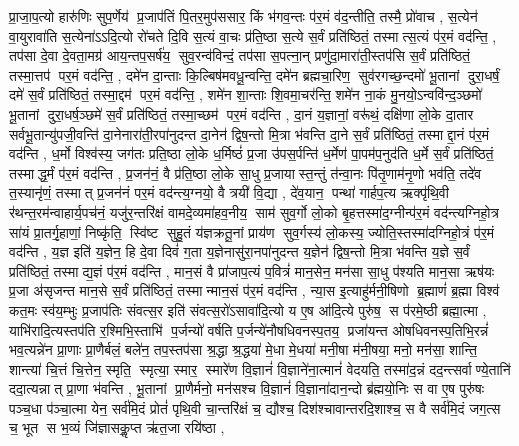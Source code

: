 प्रा॒जा॒प॒त्यो हारु॑णिः सुप॒र्णेय॑ प्र॒जाप॑तिं पि॒तर॒मुप॑ससार॒ किं भ॑गव॒न्तः प॑र॒मं व॑द॒न्तीति॒ तस्मै॒ प्रो॑वाच \sep
स॒त्येन॑ वा॒युरावा॑ति स॒त्येना॑ऽऽदि॒त्यो रो॑चते दि॒वि स॒त्यं वा॒चः प्र॑ति॒ष्ठा स॒त्ये स॒र्वं प्रति॑ष्ठितं॒ तस्मात्स॒त्यं प॑र॒मं वद॑न्ति॒ \sep
तप॑सा दे॒वा दे॒वता॒मग्र॑ आय॒न्तप॒सर्\mbox{}ष॑य॒ सुव॒रन्व॑विन्दं॒ तप॑सा स॒पत्ना॒न् प्रणु॑दा॒मारा॑ती॒स्तप॑सि स॒र्वं प्रति॑ष्ठितं॒ तस्मा॒त्तप॑ पर॒मं वद॑न्ति॒ \sep
दमे॑न दा॒न्ताः कि॒ल्बिष॑मवधू॒न्वन्ति॒ दमे॑न ब्रह्मचा॒रिण॒ सुव॑रगच्छ॒न्दमो॑ भू॒तानां दुरा॒धर्\mbox{}षं॒ दमे॑ स॒र्वं प्रति॑ष्ठितं॒ तस्मा॒द्दम॑ पर॒मं वद॑न्ति॒ \sep
शमे॑न शा॒न्ताः  शि॒वमा॒चर॑न्ति॒ शमे॑न ना॒कं मु॒नयो॒ऽन्ववि॑न्द॒ञ्छमो॑ भू॒तानां दुरा॒धर्\mbox{}ष॒ञ्छमे॑ स॒र्वं प्रति॑ष्ठितं॒ तस्मा॒च्छम॑ पर॒मं वद॑न्ति \sep
दा॒नं य॒ज्ञानां॒ वरू॑थं॒ दक्षि॑णा लो॒के दा॒तार सर्वभू॒तान्यु॑पजी॒वन्ति॑ दा॒नेनारा॑ती॒रपा॑नुदन्त दा॒नेन॑ द्विष॒न्तो मि॒त्रा भ॑वन्ति दा॒ने स॒र्वं प्रति॑ष्ठितं॒ तस्माद्दा॒नं प॑र॒मं वद॑न्ति \sep
ध॒र्मो विश्व॑स्य॒ जग॑तः प्रति॒ष्ठा लो॒के ध॒र्मिष्ठं॑ प्र॒जा उ॑पस॒र्पन्ति॑ ध॒र्मेण॑ पा॒पम॑प॒नुद॑ति ध॒र्मे स॒र्वं प्रति॑ष्ठितं॒ तस्माद्ध॒र्मं प॑र॒मं वद॑न्ति \sep
प्र॒जन॑नं॒ वै प्र॑ति॒ष्ठा लो॒के सा॒धु प्र॒जायास्त॒न्तुं त॑न्वा॒नः पि॑तृ॒णाम॑नृ॒णो भव॑ति॒ तदे॑व त॒स्यानृ॑णं॒ तस्मात् प्र॒जन॑नं पर॒मं वद॑न्त्य॒ग्नयो॒ वै त्रयी॑ वि॒द्या \sep
 दे॑व॒यान॒ पन्था॑ गार्\mbox{}हप॒त्य ऋक्पृ॑थि॒वी र॑थन्त॒रम॑न्वाहार्य॒पच॑नं॒ यजु॑र॒न्तरि॑क्षं वामदे॒व्यमा॑हव॒नीय॒ साम॑ सुव॒र्गो लो॒को बृ॒हत्तस्मा॑द॒ग्नीन्प॑र॒मं वद॑न्त्यग्निहो॒त्र सा॑यं प्रा॒तर्गृ॒हाणां॒ निष्कृ॑ति॒ स्वि॑ष्ट सुहु॒तं य॑ज्ञक्रतू॒नां प्राय॑ण सुव॒र्गस्य॑ लो॒कस्य॒ ज्योति॒स्तस्मा॑दग्निहो॒त्रं प॑र॒मं वद॑न्ति \sep
 य॒ज्ञ इति॑ य॒ज्ञेन॒ हि दे॒वा दिवं॑ ग॒ता य॒ज्ञेनासु॑रा॒नपा॑नुदन्त य॒ज्ञेन॑ द्विष॒न्तो मि॒त्रा भ॑वन्ति य॒ज्ञे स॒र्वं प्रति॑ष्ठितं॒ तस्माद्य॒ज्ञं प॑र॒मं वद॑न्ति \sep 
 मान॒सं वै प्रा॑जाप॒त्यं प॒वित्रं॑ मान॒सेन॒ मन॑सा सा॒धु प॑श्यति मान॒सा ऋष॑यः प्र॒जा अ॑सृजन्त मान॒से स॒र्वं प्रति॑ष्ठितं॒ तस्मान्मान॒सं प॑र॒मं वद॑न्ति \sep
 न्या॒स इ॒त्याहु॑र्मनी॒षिणो ब्र॒ह्माणं॑ ब्र॒ह्मा विश्व॑ कत॒मः स्व॑य॒म्भुः प्र॒जाप॑तिः संवत्स॒र इति॑ संवत्स॒रो॑ऽसावा॑दि॒त्यो य ए॒ष आ॑दि॒त्ये पुरु॑ष॒ स प॑रमे॒ष्ठी ब्रह्मा॒त्मा \sep
 याभि॑रादि॒त्यस्तप॑ति र॒श्मिभि॒स्ताभि॑ प॒र्जन्यो॑ वर्\mbox{}षति प॒र्जन्ये॑नौषधिवनस्प॒तय॒ प्रजा॑यन्त ओषधिवनस्प॒तिभि॒रन्नं॑ भव॒त्यन्ने॑न प्रा॒णाः प्रा॒णैर्बलं॒ बले॑न॒ तप॒स्तप॑सा श्र॒द्धा श्र॒द्धया॑ मे॒धा मे॒धया॑ मनी॒षा म॑नी॒षया॒ मनो॒ मन॑सा॒ शान्ति॒ शान्त्या॑ चि॒त्तं चि॒त्तेन॒ स्मृति॒ स्मृत्या॒ स्मार॒ स्मारे॑ण वि॒ज्ञानं॑  वि॒ज्ञाने॑ना॒त्मानं॑ वेदयति॒ तस्मा॑द॒न्नं दद॒न्त्सर्वाण्ये॒तानि॑ ददा॒त्यन्नात् प्रा॒णा भ॑वन्ति \sep
  भू॒तानां प्रा॒णैर्मनो॒ मन॑सश्च वि॒ज्ञानं॑  वि॒ज्ञाना॑दान॒न्दो ब्र॑ह्मयो॒निः स वा ए॒ष पुरु॑षः पञ्च॒धा प॑ञ्चा॒त्मा येन॒ सर्व॑मि॒दं प्रोतं॑ पृथि॒वी चा॒न्तरि॑क्षं च॒ द्यौश्च॒ दिश॑श्चावान्तरदि॒शाश्च॒ स वै सर्व॑मि॒दं जग॒त्स च॒ भूत स भ॒व्यं जि॑ज्ञासकॢ॒प्त ऋ॑त॒जा रयि॑ष्ठा \sep
